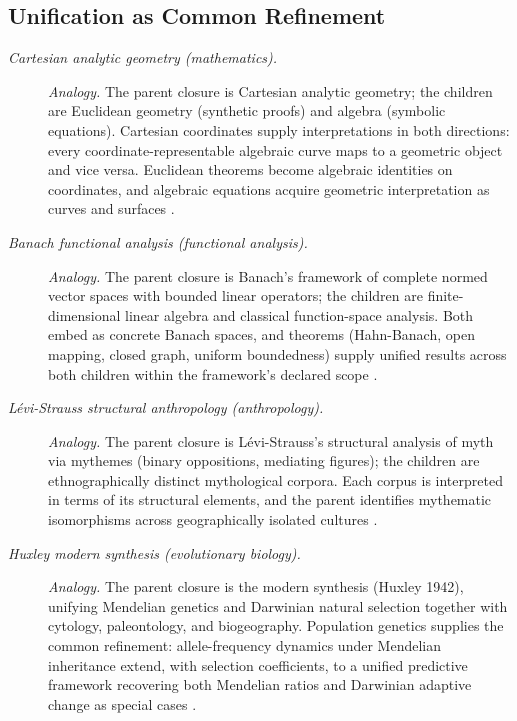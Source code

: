 \subsection*{ Unification as Common Refinement}
\begingroup\small
\begin{description}
\item[\emph{Cartesian analytic geometry
(mathematics).}] \textit{Analogy.}
The parent closure is Cartesian analytic geometry;
the children are Euclidean geometry (synthetic
proofs) and algebra (symbolic equations).  Cartesian
coordinates supply interpretations in both
directions: every coordinate-representable
algebraic curve maps to a geometric object and
vice versa.  Euclidean theorems become algebraic
identities on coordinates, and algebraic equations
acquire geometric interpretation as curves and
surfaces \citep{Descartes1637Geometrie}.

\item[\emph{Banach functional analysis (functional
analysis).}] \textit{Analogy.}
The parent closure is Banach's framework of complete
normed vector spaces with bounded linear operators;
the children are finite-dimensional linear algebra
and classical function-space analysis.  Both embed
as concrete Banach spaces, and theorems
(Hahn-Banach, open mapping, closed graph, uniform
boundedness) supply unified results across both
children within the framework's declared scope
\citep{Banach1932Theorie}.

\item[\emph{L\'evi-Strauss structural anthropology
(anthropology).}] \textit{Analogy.}
The parent closure is L\'evi-Strauss's structural
analysis of myth via mythemes (binary oppositions,
mediating figures); the children are
ethnographically distinct mythological corpora.
Each corpus is interpreted in terms of its
structural elements, and the parent identifies
mythematic isomorphisms across geographically
isolated cultures \citep{LeviStrauss1958Anthropologie}.

\item[\emph{Huxley modern synthesis (evolutionary
biology).}] \textit{Analogy.}
The parent closure is the modern synthesis (Huxley
1942), unifying Mendelian genetics and Darwinian
natural selection together with cytology,
paleontology, and biogeography.  Population
genetics supplies the common refinement:
allele-frequency dynamics under Mendelian
inheritance extend, with selection coefficients, to a
unified
predictive framework recovering both Mendelian
ratios and Darwinian adaptive change as special
cases \citep{Huxley1942Evolution}.
\end{description}
\endgroup

